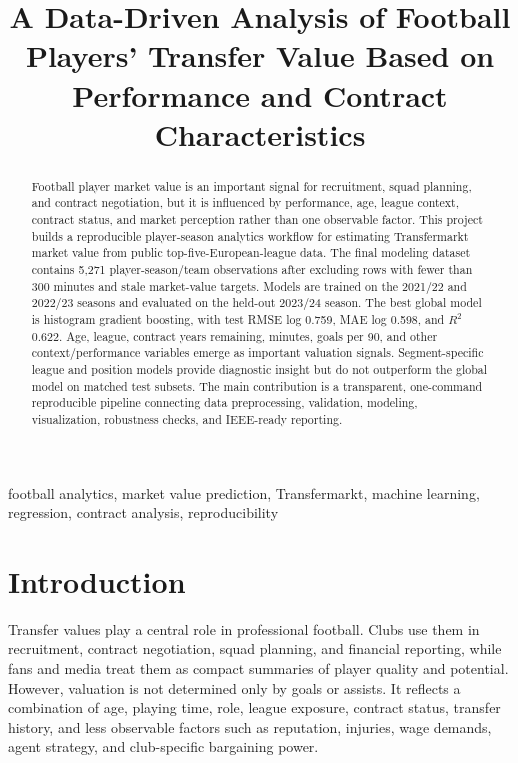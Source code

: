 \documentclass[conference]{IEEEtran}
\begin{document}
\title{A Data-Driven Analysis of Football Players' Transfer Value Based on Performance and Contract Characteristics}

\author{
\and
{}
}

\maketitle

\begin{abstract}
Football player market value is an important signal for recruitment, squad planning, and contract negotiation, but it is influenced by performance, age, league context, contract status, and market perception rather than one observable factor. This project builds a reproducible player-season analytics workflow for estimating Transfermarkt market value from public top-five-European-league data. The final modeling dataset contains 5,271 player-season/team observations after excluding rows with fewer than 300 minutes and stale market-value targets. Models are trained on the 2021/22 and 2022/23 seasons and evaluated on the held-out 2023/24 season. The best global model is histogram gradient boosting, with test RMSE log 0.759, MAE log 0.598, and \(R^2\) 0.622. Age, league, contract years remaining, minutes, goals per 90, and other context/performance variables emerge as important valuation signals. Segment-specific league and position models provide diagnostic insight but do not outperform the global model on matched test subsets. The main contribution is a transparent, one-command reproducible pipeline connecting data preprocessing, validation, modeling, visualization, robustness checks, and IEEE-ready reporting.
\end{abstract}

\begin{IEEEkeywords}
football analytics, market value prediction, Transfermarkt, machine learning, regression, contract analysis, reproducibility
\end{IEEEkeywords}

\section{Introduction}
Transfer values play a central role in professional football. Clubs use them in recruitment, contract negotiation, squad planning, and financial reporting, while fans and media treat them as compact summaries of player quality and potential. However, valuation is not determined only by goals or assists. It reflects a combination of age, playing time, role, league exposure, contract status, transfer history, and less observable factors such as reputation, injuries, wage demands, agent strategy, and club-specific bargaining power.
\end{document}
